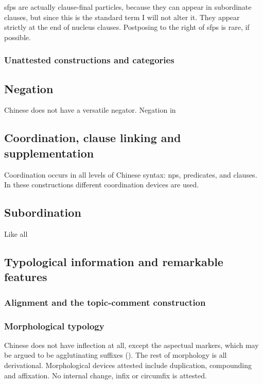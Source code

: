\documentclass[UTF8, a4paper, oneside, scheme=plain]{ctexart}
\begin{document}
\ac{sfp}s are actually clause-final particles,
because they can appear in subordinate clauses,
but since this is the standard term I will not alter it.
They appear strictly at the end of nucleus clauses.
Postposing to the right of \ac{sfp}s is rare, if possible.

\subsubsection{Unattested constructions and categories}

\subsection{Negation}

Chinese does not have a versatile negator.
Negation in 

\subsection{Coordination, clause linking and supplementation}

Coordination occurs in all levels of Chinese syntax:
\ac{np}s, predicates, and clauses.
In these constructions different coordination devices are used.

\subsection{Subordination}

Like all 

\subsection{Typological information and remarkable features}

\subsubsection{Alignment and the topic-comment construction}


\subsubsection{Morphological typology}

Chinese does not have inflection at all,
except the aspectual markers,
which may be argued to be agglutinating suffixes ().
The rest of morphology is all derivational.
Morphological devices attested include 
duplication, compounding and affixation.
No internal change, infix or circumfix is attested.
\end{document}

